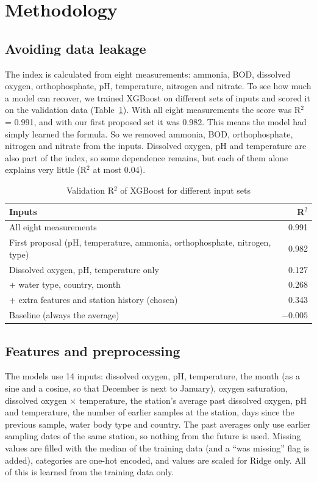 \documentclass[11pt,a4paper]{article}
\begin{document}
\section{Methodology}
\subsection{Avoiding data leakage}\label{sec:leak}
The index is calculated from eight measurements: ammonia, BOD, dissolved oxygen, orthophosphate, pH, temperature, nitrogen and nitrate. To see how much a model can recover, we trained XGBoost on different sets of inputs and scored it on the validation data (Table~\ref{tab:leak}). With all eight measurements the score was R$^2$ = 0.991, and with our first proposed set it was 0.982. This means the model had simply learned the formula. So we removed ammonia, BOD, orthophosphate, nitrogen and nitrate from the inputs. Dissolved oxygen, pH and temperature are also part of the index, so some dependence remains, but each of them alone explains very little (R$^2$ at most 0.04).
\begin{table}[H]\caption{Validation R$^2$ of XGBoost for different input sets}\label{tab:leak}\centering\small
\begin{tabular}{p{2.5in}r}\toprule Inputs & R$^2$\\\midrule
All eight measurements & 0.991\\
First proposal (pH, temperature, ammonia, orthophosphate, nitrogen, type) & 0.982\\
Dissolved oxygen, pH, temperature only & 0.127\\
+ water type, country, month & 0.268\\
+ extra features and station history (chosen) & 0.343\\
Baseline (always the average) & $-0.005$\\\bottomrule\end{tabular}\end{table}

\subsection{Features and preprocessing}
The models use 14 inputs: dissolved oxygen, pH, temperature, the month (as a sine and a cosine, so that December is next to January), oxygen saturation, dissolved oxygen $\times$ temperature, the station's average past dissolved oxygen, pH and temperature, the number of earlier samples at the station, days since the previous sample, water body type and country. The past averages only use earlier sampling dates of the same station, so nothing from the future is used. Missing values are filled with the median of the training data (and a ``was missing'' flag is added), categories are one-hot encoded, and values are scaled for Ridge only. All of this is learned from the training data only.
\end{document}
